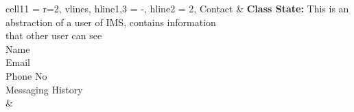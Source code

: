 \documentclass[11pt]{article}
\begin{document}
\begin{longtblr}[
  label = none,
  entry = none,
]{
  cell{1}{1} = {r=2}{},
  vlines,
  hline{1,3} = {-}{},
  hline{2} = {2}{},
}
Contact & {\textbf{Class State:} This is an abstraction of a user of IMS, contains information \\
that other user can see\\
\hspace{\dimexpr\labelsep+0.5\tabcolsep}Name\\
\hspace{\dimexpr\labelsep+0.5\tabcolsep}Email\\
\hspace{\dimexpr\labelsep+0.5\tabcolsep}Phone No\\
\hspace{\dimexpr\labelsep+0.5\tabcolsep}Messaging History} \\
        &
\end{longtblr}
\end{document}
